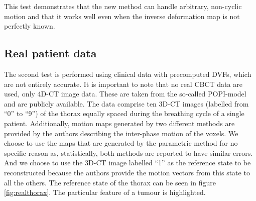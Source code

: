 This test demonstrates that the new method can handle arbitrary, non-cyclic motion and that it works well even when the inverse deformation map is not perfectly known.


\FloatBarrier
\subsection{Real patient data}

The second test is performed using clinical data with precomputed DVFs, which are not entirely accurate.  It is important to note that no real CBCT data are used, only 4D-CT image data.  These are taken from the so-called POPI-model\cite{vandemeulebroucke2007popi} and are publicly available\cite{popi-modelweb}.  The data comprise ten 3D-CT images (labelled from ``0'' to ``9'') of the thorax equally spaced during the breathing cycle of a single patient.  Additionally, motion maps generated by two different methods are provided by the authors describing the inter-phase motion of the voxels.  We choose to use the maps that are generated by the parametric method for no specific reason as, statistically, both methods are reported to have similar errors.  And we choose to use the 3D-CT image labelled ``1'' as the reference state to be reconstructed because the authors provide the motion vectors from this state to all the others.  The reference state of the thorax can be seen in figure \ref{fig:realthorax}.  The particular feature of a tumour is highlighted.




